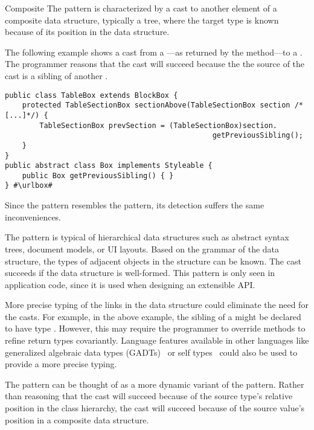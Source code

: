 \begin{pattern}{Composite}
The \thisp{} pattern is characterized by a cast to another element of a
composite data structure, typically a tree, where the target type is known because of its
position in the data structure.

\instancessrc{}
The following example shows a cast from a ---as returned by the  method---to a .
The programmer reasons that the cast will succeed because the 
the source of the cast is a sibling of another .

\def\urlvar{http://bit.ly/flyingsaucerproject_flyingsaucer_2N2nYbY}
\begin{verbatim}
public class TableBox extends BlockBox {
    protected TableSectionBox sectionAbove(TableSectionBox section /*[...]*/) {
        TableSectionBox prevSection = (TableSectionBox)section.
                                                getPreviousSibling();
    }
}
public abstract class Box implements Styleable {
    public Box getPreviousSibling() { }
} #\urlbox#
\end{verbatim}


\detection{}
Since the \thisp{} pattern resembles the  pattern,
its detection suffers the same inconveniences.


\issues{}
The pattern is typical of hierarchical data structures such as abstract syntax
trees, document models, or UI layouts. Based on the grammar of 
the data structure, the types of adjacent objects in the structure can be known.
The cast succeeds if the data structure is well-formed.
This pattern is only seen in application code,
since it is used when designing an extensible API.

More precise typing of the links in the data structure could 
eliminate the need for the casts. For example, in the above example,
the sibling of a  might be declared to have type
. However, this may require the programmer to override
methods to refine return types covariantly.
Language features available in other languages like generalized algebraic data types (GADTs)~\citep{gadts} or self types~\citep{bruceChallengingTypingIssues2003,scalaIndependentlyExtensible} could also be used to provide a more precise typing.

The pattern can be thought of as a more dynamic variant of the
 pattern. Rather than
reasoning that the cast will succeed because of the source type's relative position in the 
class hierarchy, the cast will succeed because of the source value's position
in a composite data structure.

\end{pattern}
